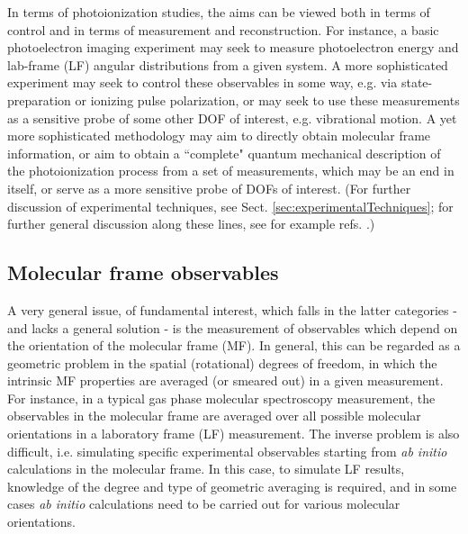 \documentclass[10pt]{article}
\begin{document}
In terms of photoionization studies, the aims can be viewed both in terms of control and in terms of measurement and reconstruction. For instance, a basic photoelectron imaging experiment may seek to measure photoelectron energy and lab-frame (LF) angular distributions from a given system. A more sophisticated experiment may seek to control these observables in some way, e.g. via state-preparation or ionizing pulse polarization, or may seek to use these measurements as a sensitive probe of some other DOF of interest, e.g. vibrational motion. A yet more sophisticated methodology may aim to directly obtain molecular frame information, or aim to obtain a ``complete" quantum mechanical description of the photoionization process from a set of measurements, which may be an end in itself, or serve as a more sensitive probe of DOFs of interest. (For further discussion of experimental techniques, see Sect. \ref{sec:experimentalTechniques}; for further general discussion along these lines, see for example refs. \cite{hockett2018QMP1, kleinpoppen2013perfect, Reid2012, Stolow2008}.)
\subsection{Molecular frame observables\label{sec:MF-intro}}

A very general issue, of fundamental interest, which falls in the latter categories - and lacks a general solution - is the measurement of observables which depend on the orientation of the molecular frame (MF). In general, this can be regarded as a geometric problem in the spatial (rotational) degrees of freedom, in which the intrinsic MF properties are averaged (or smeared out) in a given measurement. For instance, in a typical gas phase molecular spectroscopy measurement, the observables in the molecular frame  are averaged over all possible molecular orientations in a laboratory frame (LF) measurement. The inverse problem is also difficult, i.e. simulating specific experimental observables starting from \textit{ab initio} calculations in the molecular frame. In this case, to simulate LF results, knowledge of the degree and type of geometric averaging is required, and in some cases \textit{ab initio} calculations need to be carried out for various molecular orientations.
\end{document}
